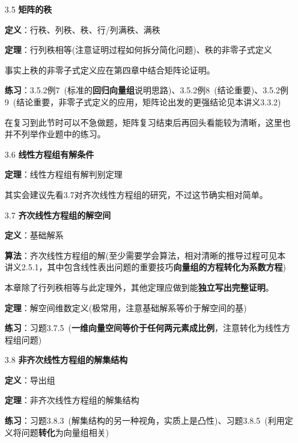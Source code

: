 \documentclass[a4paper,UTF8,fontset=windows]{ctexart}
\newcommand*{\note}{\noindent *}
\begin{document}
\begin{enumerate}
    \item[3.5] \textbf{矩阵的秩}
    
    \textbf{定义}：行秩、列秩、秩、行/列满秩、满秩

    \textbf{定理}：行列秩相等(注意证明过程如何拆分简化问题)、秩的非零子式定义

    \note 事实上秩的非零子式定义应在第四章中结合矩阵论证明。

    \textbf{练习}：3.5.2例7\ (标准的\textbf{回归向量组}说明思路)、3.5.2例8\ (结论重要)、3.5.2例9\ (结论重要，非零子式定义的应用，矩阵论出发的更强结论见本讲义3.3.2)

    \note 在复习到此节时可以不急做题，矩阵复习结束后再回头看能较为清晰，这里也并不列举作业题中的练习。

    \item[3.6] \textbf{线性方程组有解条件}
    
    \textbf{定理}：线性方程组有解判别定理

    \note 其实会建议先看3.7对齐次线性方程组的研究，不过这节确实相对简单。

    \item[3.7] \textbf{齐次线性方程组的解空间}
    
    \textbf{定义}：基础解系

    \textbf{算法}：齐次线性方程组的解(至少需要学会算法，相对清晰的推导过程可见本讲义2.5.1，其中包含线性表出问题的重要技巧\textbf{向量组的方程转化为系数方程})

    \note 本章除了行列秩相等与此定理外，其他定理应做到能\textbf{独立写出完整证明}。

    \textbf{定理}：解空间维数定义(极常用，注意基础解系等价于解空间的基)

    \textbf{练习}：习题3.7.5\ (\textbf{一维向量空间等价于任何两元素成比例}，注意转化为线性方程组问题)

    \item[3.8] \textbf{非齐次线性方程组的解集结构}
    
    \textbf{定义}：导出组

    \textbf{定理}：非齐次线性方程组的解集结构

    \textbf{练习}：习题3.8.3\ (解集结构的另一种视角，实质上是凸性)、习题3.8.5\ (利用定义将问题\textbf{转化}为向量组相关)
\end{enumerate}
\end{document}
